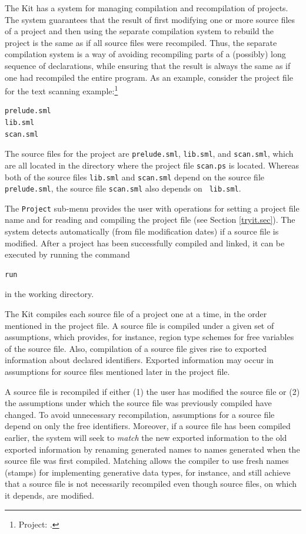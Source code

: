 \documentclass[12pt]{book}
\begin{document}
The Kit has a system for managing compilation and recompilation of
projects.  The system guarantees that the result of first modifying
one or more source files of a project and then using the separate
compilation system to rebuild the project is the same as if all source
files were
recompiled.
Thus, the separate compilation system is a way of avoiding recompiling
parts of a (possibly) long sequence of declarations, while ensuring
that the result is always the same as if one had recompiled the entire
program.  As an example, consider the project file for the text
scanning example:\footnote{Project: .}
\begin{verbatim}
prelude.sml
lib.sml
scan.sml
\end{verbatim}

\noindent 
The source files for the project are {\tt prelude.sml}, {\tt lib.sml},
and {\tt scan.sml}, which are all located in the directory where the
project file {\tt scan.ps} is located. Whereas both of the source
files {\tt lib.sml} and {\tt scan.sml} depend on the source file {\tt
prelude.sml}, the source file {\tt scan.sml} also depends on {\tt
lib.sml}.

The {\tt Project} sub-menu provides the user with operations for
setting a project file name and for reading and compiling the project
file (see Section \ref{tryit.sec}). The system detects automatically
(from file modification dates) if a source file is modified.  After a
project has been successfully compiled and linked, it can be executed
by running the command
\begin{verbatim}
run
\end{verbatim}
in the working directory.  

The Kit compiles each source file of a project one at a time, in the
order mentioned in the project file. A source file is compiled under
a given set of assumptions, which provides, for instance, region type
schemes for free variables of the source file. Also, compilation of a
source file gives rise to exported information about declared
identifiers. Exported information may occur in assumptions for source
files mentioned later in the project file.

A source file is recompiled if either (1) the user has modified the
source file or (2) the assumptions under which the source file was
previously compiled have changed. To avoid unnecessary recompilation,
assumptions for a source file depend on only the free identifiers.
Moreover, if a source file has been compiled earlier, the system will
seek to {\em match\/} the new exported information to
the old exported information by renaming generated names to names
generated when the source file was first compiled. Matching allows the
compiler to use fresh names (stamps) for implementing generative data
types, for instance, and still achieve that a source file is not
necessarily recompiled even though source files, on which it depends,
are modified.
\end{document}
